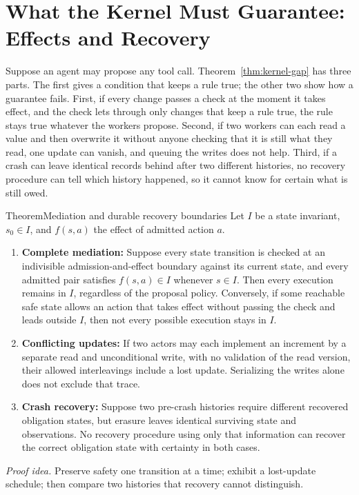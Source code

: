 \section{What the Kernel Must Guarantee: Effects and Recovery}\label{pre:sec:kernel-gap}

Suppose an agent may propose any tool call. Theorem~\ref{thm:kernel-gap} has three parts. The first gives a condition that keeps a rule true; the other two show how a guarantee fails. First, if every change passes a check at the moment it takes effect, and the check lets through only changes that keep a rule true, the rule stays true whatever the workers propose. Second, if two workers can each read a value and then overwrite it without anyone checking that it is still what they read, one update can vanish, and queuing the writes does not help. Third, if a crash can leave identical records behind after two different histories, no recovery procedure can tell which history happened, so it cannot know for certain what is still owed.

\begin{pdclaim}{Theorem}{Mediation and durable recovery boundaries}\label{thm:kernel-gap}
Let $I$ be a state invariant, $s_0\in I$, and $f(s,a)$ the effect of admitted action $a$.
\begin{enumerate}[leftmargin=1.5em,itemsep=1.5pt]
  \item \textbf{Complete mediation:} Suppose every state transition is checked at an indivisible admission-and-effect boundary against its current state, and every admitted pair satisfies $f(s,a)\in I$ whenever $s\in I$. Then every execution remains in $I$, regardless of the proposal policy. Conversely, if some reachable safe state allows an action that takes effect without passing the check and leads outside $I$, then not every possible execution stays in $I$.
  \item \textbf{Conflicting updates:} If two actors may each implement an increment by a separate read and unconditional write, with no validation of the read version, their allowed interleavings include a lost update. Serializing the writes alone does not exclude that trace.
  \item \textbf{Crash recovery:} Suppose two pre-crash histories require different recovered obligation states, but erasure leaves identical surviving state and observations. No recovery procedure using only that information can recover the correct obligation state with certainty in both cases.
\end{enumerate}
\end{pdclaim}
\noindent\textit{Proof idea.} Preserve safety one transition at a time; exhibit a lost-update schedule; then compare two histories that recovery cannot distinguish.

